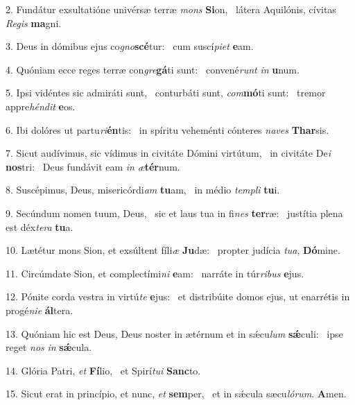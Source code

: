 2. Fundátur exsultatióne univérsæ terræ \textit{mons} \textbf{Si}on, \ast\  látera Aquilónis, cívitas \textit{Re}\textit{gis} \textbf{ma}gni.\

3. Deus in dómibus ejus co\textit{gno}\textbf{scé}tur: \ast\  cum suscí\textit{pi}\textit{et} \textbf{e}am.\

4. Quóniam ecce reges terræ con\textit{gre}\textbf{gá}ti sunt: \ast\  convené\textit{runt} \textit{in} \textbf{u}num.\

5. Ipsi vidéntes sic admiráti sunt, \dag\  conturbáti sunt, \textit{com}\textbf{mó}ti sunt: \ast\  tremor appre\textit{hén}\textit{dit} \textbf{e}os.\

6. Ibi dolóres ut partu\textit{ri}\textbf{én}tis: \ast\  in spíritu veheménti cónteres \textit{na}\textit{ves} \textbf{Thar}sis.\

7. Sicut audívimus, sic vídimus in civitáte Dómini virtútum, \dag\  in civitáte De\textit{i} \textbf{nos}tri: \ast\  Deus fundávit eam \textit{in} \textit{æ}\textbf{tér}num.\

8. Suscépimus, Deus, misericórdi\textit{am} \textbf{tu}am, \ast\  in médio \textit{tem}\textit{pli} \textbf{tu}i.\

9. Secúndum nomen tuum, Deus, \dag\  sic et laus tua in fi\textit{nes} \textbf{ter}ræ: \ast\  justítia plena est déx\textit{te}\textit{ra} \textbf{tu}a.\

10. Lætétur mons Sion, et exsúltent fíli\textit{æ} \textbf{Ju}dæ: \ast\  propter judícia \textit{tu}\textit{a}, \textbf{Dó}mine.\

11. Circúmdate Sion, et complectími\textit{ni} \textbf{e}am: \ast\  narráte in túr\textit{ri}\textit{bus} \textbf{e}jus.\

12. Pónite corda vestra in virtú\textit{te} \textbf{e}jus: \ast\  et distribúite domos ejus, ut enarrétis in progé\textit{ni}\textit{e} \textbf{ál}tera.\

13. Quóniam hic est Deus, Deus noster in ætérnum et in sǽcu\textit{lum} \textbf{sǽ}culi: \ast\  ipse reget \textit{nos} \textit{in} \textbf{sǽ}cula.\

14. Glória Patri, \textit{et} \textbf{Fí}lio, \ast\  et Spirí\textit{tu}\textit{i} \textbf{Sanc}to.\

15. Sicut erat in princípio, et nunc, \textit{et} \textbf{sem}per, \ast\  et in sǽcula sæcu\textit{ló}\textit{rum}. \textbf{A}men.\

